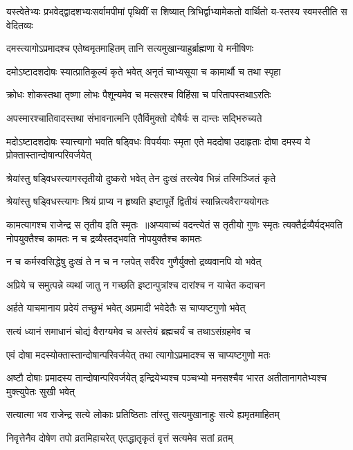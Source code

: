 \twolineshloka
{यस्त्वेतेभ्यः प्रभवेद्द्वादशभ्यःसर्वामपीमां पृथिवीं स शिष्यात्}
{त्रिभिर्द्वाभ्यामेकतो वार्थितो य-स्तस्य स्वमस्तीति स वेदितव्यः}


\twolineshloka
{दमस्त्यागोऽप्रमादश्च एतेष्वमृतमाहितम्}
{तानि सत्यमुखान्याहुर्ब्राह्मणा ये मनीषिणः}


\twolineshloka
{दमोऽष्टादशदोषः स्यात्प्रातिकूल्यं कृते भवेत्}
{अनृतं चाभ्यसूया च कामार्थौ च तथा स्पृहा}


\twolineshloka
{क्रोधः शोकस्तथा तृष्णा लोभः पैशून्यमेव च}
{मत्सरश्च विहिंसा च परितापस्तथाऽरतिः}


\twolineshloka
{अपस्मारश्चातिवादस्तथा संभावनात्मनि}
{एतैर्विमुक्तो दोषैर्यः स दान्तः सद्भिरुच्यते}


\threelineshloka
{मदोऽष्टादशदोषः स्यात्त्यागो भवति षड्विधः}
{विपर्ययाः स्मृता एते मददोषा उदाहृताः}
{दोषा दमस्य ये प्रोक्तास्तान्दोषान्परिवर्जयेत्}


\twolineshloka
{श्रेयांस्तु षड्विधस्त्यागस्तृतीयो दुष्करो भवेत्}
{तेन दुःखं तरत्येव भिन्नं तस्मिञ्जितं कृते}


\twolineshloka
{श्रेयांस्तु षड्विधस्त्यागः श्रियं प्राप्य न हृष्यति}
{इष्टापूर्ते द्वितीयं स्यान्नित्यवैराग्ययोगतः}


कामत्यागश्च राजेन्द्र स तृतीय इति स्मृतः ॥अप्यवाच्यं वदन्त्येतं स तृतीयो गुणः स्मृतः
\twolineshloka
{त्यक्तैर्द्रव्यैर्यद्भवति नोपयुक्तैश्च कामतः}
{न च द्रव्यैस्तद्भवति नोपयुक्तैश्च कामतः}


\twolineshloka
{न च कर्मस्वसिद्धेषु दुःखं ते न च न ग्लपेत्}
{सर्वैरेव गुणैर्युक्तो द्रव्यवानपि यो भवेत्}


\twolineshloka
{अप्रिये च समुत्पन्ने व्यथां जातु न गच्छति}
{इष्टान्पुत्रांश्च दारांश्च न याचेत कदाचन}


\twolineshloka
{अर्हते याचमानाय प्रदेयं तच्छुभं भवेत्}
{अप्रमादी भवेदेतैः स चाप्यष्टगुणो भवेत्}


\twolineshloka
{सत्यं ध्यानं समाधानं चोद्यं वैराग्यमेव च}
{अस्तेयं ब्रह्मचर्यं च तथाऽसंग्रहमेव च}


\twolineshloka
{एवं दोषा मदस्योक्तास्तान्दोषान्परिवर्जयेत्}
{तथा त्यागोऽप्रमादश्च स चाप्यष्टगुणो मतः}


\threelineshloka
{अष्टौ दोषाः प्रमादस्य तान्दोषान्परिवर्जयेत्}
{इन्द्रियेभ्यश्च पञ्चभ्यो मनसश्चैव भारत}
{अतीतानागतेभ्यश्च मुक्त्युपेतः सुखी भवेत्}


\twolineshloka
{सत्यात्मा भव राजेन्द्र सत्ये लोकाः प्रतिष्ठिताः}
{तांस्तु सत्यमुखानाहुः सत्ये ह्यमृतमाहितम्}


\twolineshloka
{निवृत्तेनैव दोषेण तपो व्रतमिहाचरेत्}
{एतद्धातृकृतं वृत्तं सत्यमेव सतां व्रतम्}


